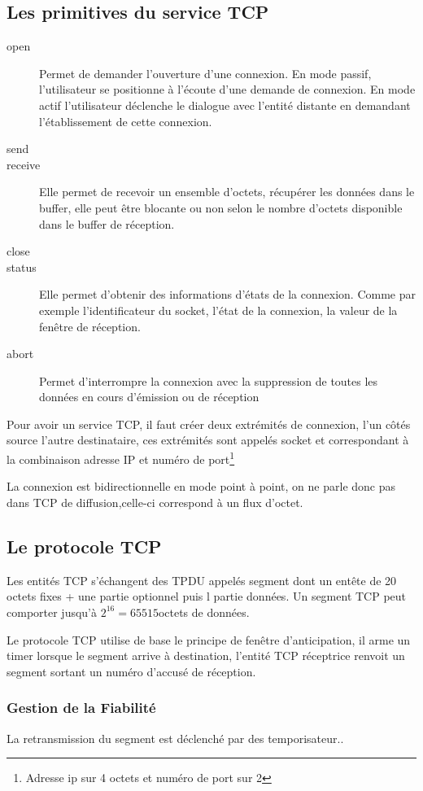 \documentclass[12pt,a4paper,openany]{book}
\begin{document}
	\subsection{Les primitives du service TCP}
	\begin{description}
		\item[open] Permet de demander l'ouverture d'une connexion. En mode passif, l'utilisateur se positionne à l'écoute d'une demande de connexion.
			En mode actif l'utilisateur déclenche le dialogue avec l'entité distante en demandant l'établissement de cette connexion.
		\item[send] 
		\item[receive] Elle permet de recevoir un ensemble d'octets, récupérer les données dans le buffer, elle peut être blocante ou non selon le
			nombre d'octets disponible dans le buffer de réception.
		\item[close]  
		\item[status] Elle permet d'obtenir des informations d'états de la connexion. Comme par exemple l'identificateur du socket, l'état de la
			connexion, la valeur de la fenêtre de réception.
		\item[abort]  Permet d'interrompre la connexion avec la suppression de toutes les données en cours d'émission ou de réception
	\end{description}
	Pour avoir un service TCP, il faut créer deux extrémités  de connexion, l'un côtés source l'autre destinataire, ces extrémités sont appelés socket
	et correspondant à la combinaison adresse IP et numéro de port\footnote{Adresse ip sur 4 octets et numéro de port sur 2}

	La connexion est bidirectionnelle en mode point à point, on ne parle donc pas dans TCP de diffusion,celle-ci correspond à un flux d'octet.

	\subsection{Le protocole TCP}
	Les entités TCP s'échangent des TPDU appelés segment dont un entête de 20 octets fixes + une partie optionnel puis l partie données. Un segment TCP
	peut comporter jusqu'à $2^{16} = 65515$octets de données.

	Le protocole TCP utilise de base le principe de fenêtre d'anticipation, il arme un timer lorsque le segment arrive à destination, l'entité TCP
	réceptrice renvoit un segment sortant un numéro d'accusé de réception. 

	\subsubsection{Gestion de la Fiabilité}
		La retransmission du segment est déclenché par des temporisateur..
\end{document}
